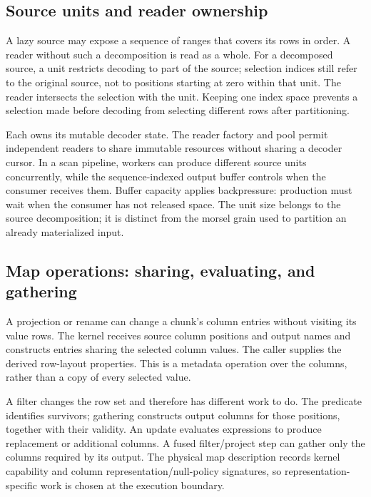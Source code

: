 
\subsection{Source units and reader ownership}
A lazy source may expose a sequence of  ranges that covers
its rows in order. A reader without such a decomposition is read as a whole.
For a decomposed source, a unit restricts decoding to part of the source;
selection indices still refer to the original source, not to positions
starting at zero within that unit. The reader intersects the selection with
the unit. Keeping one index space prevents a selection made before decoding
from selecting different rows after partitioning.

Each  owns its mutable decoder state. The reader
factory and pool permit independent readers to share immutable resources
without sharing a decoder cursor. In a scan pipeline, workers can produce
different source units concurrently, while the sequence-indexed output buffer
controls when the consumer receives them. Buffer capacity applies
backpressure: production must wait when the consumer has not released space.
The unit size belongs to the source decomposition; it is distinct from the
morsel grain used to partition an already materialized input.


\subsection{Map operations: sharing, evaluating, and gathering}
A projection or rename can change a chunk's column entries without visiting
its value rows. The  kernel receives source column positions
and output names and constructs entries sharing the selected column values.
The caller supplies the derived row-layout properties. This is a metadata
operation over the columns, rather than a copy of every selected value.

A filter changes the row set and therefore has different work to do. The
predicate identifies survivors; gathering constructs output columns for those
positions, together with their validity. An update evaluates expressions to
produce replacement or additional columns. A fused filter/project step can
gather only the columns required by its output. The physical map description
records kernel capability and column representation/null-policy signatures,
so representation-specific work is chosen at the execution boundary.


